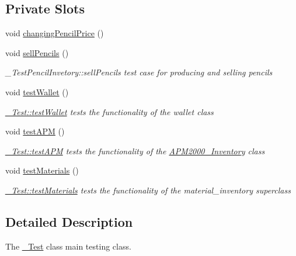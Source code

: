 \subsection*{Private Slots}
\begin{DoxyCompactItemize}
\item 
void \hyperlink{class__Test_a9cabdf9e5c265487d99174166d9206ff}{changing\+Pencil\+Price} ()
\item 
void \hyperlink{class__Test_a92dbc86899cfc80c08981ddcace05b5e}{sell\+Pencils} ()
\begin{DoxyCompactList}\small\item\em \+\_\+\+Test\+Pencil\+Invetory\+::sell\+Pencils test case for producing and selling pencils \end{DoxyCompactList}\item 
void \hyperlink{class__Test_afbce4b6817db0c8423dd4296a18f75de}{test\+Wallet} ()
\begin{DoxyCompactList}\small\item\em \hyperlink{class__Test_afbce4b6817db0c8423dd4296a18f75de}{\+\_\+\+Test\+::test\+Wallet} tests the functionality of the wallet class \end{DoxyCompactList}\item 
void \hyperlink{class__Test_adb7f71ea12e1b02afd6b4d1f7d65c1eb}{test\+A\+PM} ()
\begin{DoxyCompactList}\small\item\em \hyperlink{class__Test_adb7f71ea12e1b02afd6b4d1f7d65c1eb}{\+\_\+\+Test\+::test\+A\+PM} tests the functionality of the \hyperlink{classAPM2000__Inventory}{A\+P\+M2000\+\_\+\+Inventory} class \end{DoxyCompactList}\item 
void \hyperlink{class__Test_ad5396e54792008660924db2e16edb614}{test\+Materials} ()
\begin{DoxyCompactList}\small\item\em \hyperlink{class__Test_ad5396e54792008660924db2e16edb614}{\+\_\+\+Test\+::test\+Materials} tests the functionality of the material\+\_\+inventory superclass \end{DoxyCompactList}\end{DoxyCompactItemize}


\subsection{Detailed Description}
The \hyperlink{class__Test}{\+\_\+\+Test} class main testing class. 

